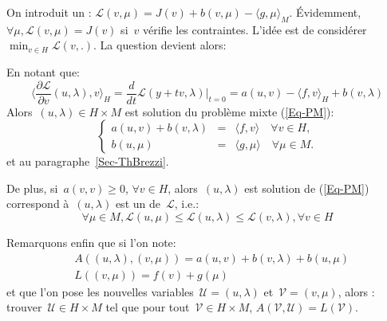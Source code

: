 \medskip



On introduit un :
$\mathscr{L}(v,\mu) = J(v)+b(v,\mu) - \langle g,\mu\rangle_M$.
Évidemment, $\forall\mu, \mathscr{L}(v,\mu)=J(v)$ si~$v$ vérifie les contraintes.
L'idée est de considérer~$\min_{v\in H} \mathscr{L}(v,.)$.
La question devient alors: 


\medskip



En notant que:
\begin{equation}\langle\frac{\partial\mathscr{L}}{\partial v}(u,\lambda),v\rangle_H
=\frac d{dt}\mathscr{L}(y+tv,\lambda)|_{t=0}
=a(u,v)-\langle f,v\rangle_H+b(v,\lambda)
\end{equation}
Alors~$(u,\lambda) \in H\times M$ est solution du problème mixte (\ref{Eq-PM}):
 \begin{equation}\left\{
\begin{array}{rcl}
 a(u,v) + b(v, \lambda) &=& \langle f,v\rangle \quad \forall v\in H,\\
b(u,\mu) &=& \langle g,\mu\rangle \quad \forall \mu \in M.
\end{array}\right.
\end{equation}
et  au paragraphe~\ref{Sec-ThBrezzi}.

\medskip
De plus, si~$a(v,v)\ge 0$, $\forall v\in H$, alors~$(u,\lambda)$ est
solution de (\ref{Eq-PM}) correspond à~$(u,\lambda)$ est un 
de~$\mathscr{L}$, i.e.:
\begin{equation}
\forall\mu\in M, \mathscr{L}(u,\mu) \le \mathscr{L}(u,\lambda) \le
\mathscr{L}(v,\lambda), \forall v\in H
\end{equation}


\medskip
Remarquons enfin que si l'on note:
\begin{align}&A((u,\lambda),(v,\mu))=a(u,v)+b(v,\lambda)+b(u,\mu)\\
&L((v,\mu))=f(v)+g(\mu)\end{align}
et que l'on pose les nouvelles variables~$\mathscr{U}=(u,\lambda)$ et~$\mathscr{V}=(v,\mu)$,
alors : trouver~$\mathscr{U}\in H\times M$
tel que pour tout~$\mathscr{V}\in H\times M$, $A(\mathscr{V},\mathscr{U})=L(\mathscr{V})$.

